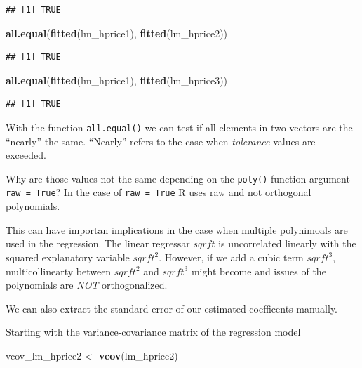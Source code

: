 \documentclass[]{book}
\newenvironment{Shaded}{\begin{snugshade}}{\end{snugshade}}
\newcommand{\KeywordTok}[1]{\textcolor[rgb]{0.13,0.29,0.53}{\textbf{#1}}}
\newcommand{\NormalTok}[1]{#1}
\newcommand{\StringTok}[1]{\textcolor[rgb]{0.31,0.60,0.02}{#1}}
\begin{document}
\begin{verbatim}
## [1] TRUE
\end{verbatim}

\begin{Shaded}
\begin{Highlighting}[]
\KeywordTok{all.equal}\NormalTok{(}\KeywordTok{fitted}\NormalTok{(lm_hprice1), }\KeywordTok{fitted}\NormalTok{(lm_hprice2))}
\end{Highlighting}
\end{Shaded}

\begin{verbatim}
## [1] TRUE
\end{verbatim}

\begin{Shaded}
\begin{Highlighting}[]
\KeywordTok{all.equal}\NormalTok{(}\KeywordTok{fitted}\NormalTok{(lm_hprice1), }\KeywordTok{fitted}\NormalTok{(lm_hprice3))}
\end{Highlighting}
\end{Shaded}

\begin{verbatim}
## [1] TRUE
\end{verbatim}

With the function \texttt{all.equal()} we can test if all elements in
two vectors are the ``nearly'' the same. ``Nearly'' refers to the case
when \emph{tolerance} values are exceeded.

Why are those values not the same depending on the \texttt{poly()}
function argument \texttt{raw\ =\ True}? In the case of
\texttt{raw\ =\ True} R uses raw and not orthogonal polynomials.

This can have importan implications in the case when multiple
polynimoals are used in the regression. The linear regressar \(sqrft\)
is uncorrelated linearly with the squared explanatory variable
\(sqrft^2\). However, if we add a cubic term \(sqrft^3\),
multicollinearty between \(sqrft^2\) and \(sqrft^3\) might become and
issues of the polynomials are \emph{NOT} orthogonalized.

We can also extract the standard error of our estimated coefficents
manually.

Starting with the variance-covariance matrix of the regression model

\begin{Shaded}
\begin{Highlighting}[]
\NormalTok{vcov_lm_hprice2 <-}\StringTok{ }\KeywordTok{vcov}\NormalTok{(lm_hprice2)}
\end{Highlighting}
\end{Shaded}
\end{document}
